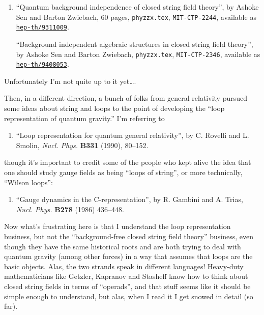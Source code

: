 \documentclass{article}
\def\tightlist{}
\begin{document}
\begin{enumerate}
\def\labelenumi{\arabic{enumi})}
\setcounter{enumi}{3}
\item
  ``Quantum background independence of closed string field theory'', by
  Ashoke Sen and Barton Zwiebach, 60 pages, \texttt{phyzzx.tex},
  \texttt{MIT-CTP-2244}, available as
  \href{http://xxx.lanl.gov/abs/hep-th/9311009}{\texttt{hep-th/9311009}}.

  ``Background independent algebraic structures in closed string field
  theory'', by Ashoke Sen and Barton Zwiebach, \texttt{phyzzx.tex},
  \texttt{MIT-CTP-2346}, available as
  \href{http://xxx.lanl.gov/abs/hep-th/9408053}{\texttt{hep-th/9408053}}.
\end{enumerate}

Unfortunately I'm not quite up to it yet\ldots.

Then, in a different direction, a bunch of folks from general relativity
pursued some ideas about string and loops to the point of developing the
``loop representation of quantum gravity.'' I'm referring to

\begin{enumerate}
\def\labelenumi{\arabic{enumi})}
\setcounter{enumi}{4}
\tightlist
\item
  ``Loop representation for quantum general relativity'', by C. Rovelli
  and L. Smolin, \emph{Nucl. Phys.} \textbf{B331} (1990), 80--152.
\end{enumerate}

though it's important to credit some of the people who kept alive the
idea that one should study gauge fields as being ``loops of string'', or
more technically, ``Wilson loops'':

\begin{enumerate}
\def\labelenumi{\arabic{enumi})}
\setcounter{enumi}{5}
\tightlist
\item
  ``Gauge dynamics in the C-representation'', by R. Gambini and A.
  Trias, \emph{Nucl. Phys.} \textbf{B278} (1986) 436--448.
\end{enumerate}

Now what's frustrating here is that I understand the loop representation
business, but not the ``background-free closed string field theory''
business, even though they have the same historical roots and are both
trying to deal with quantum gravity (among other forces) in a way that
assumes that loops are the basic objects. Alas, the two strands speak in
different languages! Heavy-duty mathematicians like Getzler, Kapranov
and Stasheff know how to think about closed string fields in terms of
``operads'', and that stuff seems like it should be simple enough to
understand, but alas, when I read it I get snowed in detail (so far).
\end{document}
